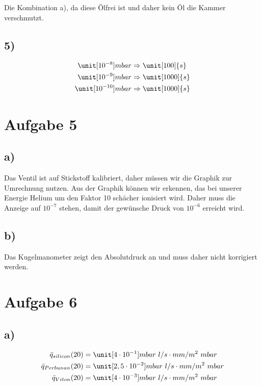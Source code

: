 Die Kombination a), da diese Ölfrei ist und daher kein Öl die Kammer verschmutzt.

\subsection*{5)}

\begin{align*}
\unit[10^{-8}]{mbar} &\Rightarrow \unit[100]{s} \\
\unit[10^{-9}]{mbar} &\Rightarrow \unit[1000]{s} \\
\unit[10^{-10}]{mbar} &\Rightarrow \unit[1000]{s} \\
\end{align*}


\section{Aufgabe 5}

\subsection*{a)}

Das Ventil ist auf Stickstoff kalibriert, daher müssen wir die Graphik zur Umrechnung nutzen. Aus der Graphik können wir erkennen, das bei unserer Energie Helium um den Faktor 10 schächer ionisiert wird. Daher muss die Anzeige auf $10^{-7}$ stehen, damit der gewünsche Druck von $10^{-6}$ erreicht wird.

\subsection*{b)}

Das Kugelmanometer zeigt den Absolutdruck an und muss daher nicht korrigiert werden.


\section{Aufgabe 6}

\subsection*{a)}

\begin{align*}
\bar{q}_{silicon}(20) &= \unit[4 \cdot 10^{-1}]{mbar\ l / s \cdot mm/ m^2 \ mbar} \\
\bar{q}_{Perbunan}(20) &= \unit[2,5 \cdot 10^{-2}]{mbar\ l / s \cdot mm/ m^2 \ mbar} \\
\bar{q}_{Viton}(20) &= \unit[4 \cdot 10^{-3}]{mbar\ l / s \cdot mm/ m^2 \ mbar} \\
\end{align*}

